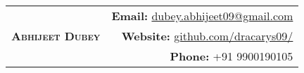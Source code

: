 \documentclass[a4paper,10pt]{article}
\newcommand{\lsep}{-0.5cm}
\newcommand{\resheading}[1]{{\small
        {
            \begin{minipage}
                {0.975\textwidth}\textbf{{\textsc{#1 \vphantom{p\^{E}} }}}
                \\[-0.3cm]
                \hrule
            \end{minipage}
            \\[-0.5cm]
        }
 }}
\begin{document}

\indent \begin{tabular*}{\textwidth}{@{\extracolsep{\fill}}lr}
\multirow{3}{*}{\huge\textsc{\textbf{Abhijeet Dubey}}}	& \textbf{Email:} \href{mailto:dubey.abhijeet09@gmail.com}{dubey.abhijeet09@gmail.com}				\\
							& \textbf{Website:} \href{https://github.com/dracarys09/}{github.com/dracarys09/}	\\
							& \textbf{Phone:} +91 9900190105
\end{tabular*}

\end{document}
